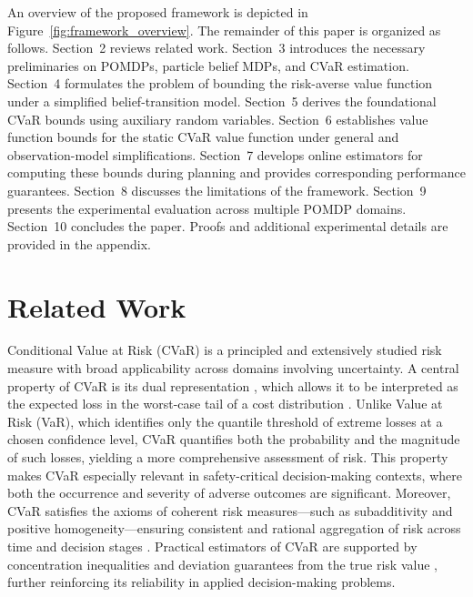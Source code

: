 \documentclass[acmlarge, manuscript, screen, review, natbib=false, oneside]{acmart}
\begin{document}
An overview of the proposed framework is depicted in Figure~\ref{fig:framework_overview}. The remainder of this paper is organized as follows. Section~2 reviews related work. Section~3 introduces the necessary preliminaries on POMDPs, particle belief MDPs, and CVaR estimation. Section~4 formulates the problem of bounding the risk-averse value function under a simplified belief-transition model. Section~5 derives the foundational CVaR bounds using auxiliary random variables. Section~6 establishes value function bounds for the static CVaR value function under general and observation-model simplifications. Section~7 develops online estimators for computing these bounds during planning and provides corresponding performance guarantees. Section~8 discusses the limitations of the framework. Section~9 presents the experimental evaluation across multiple POMDP domains. Section~10 concludes the paper. Proofs and additional experimental details are provided in the appendix.

\section{Related Work}
Conditional Value at Risk (CVaR) \cite{rockafellar2000optimization} is a principled and extensively studied risk measure with broad applicability across domains involving uncertainty. A central property of CVaR is its dual representation \cite{artzner1999coherent}, which allows it to be interpreted as the expected loss in the worst-case tail of a cost distribution \cite{chow2015risk}. Unlike Value at Risk (VaR), which identifies only the quantile threshold of extreme losses at a chosen confidence level, CVaR quantifies both the probability and the magnitude of such losses, yielding a more comprehensive assessment of risk. This property makes CVaR especially relevant in safety-critical decision-making contexts, where both the occurrence and severity of adverse outcomes are significant. Moreover, CVaR satisfies the axioms of coherent risk measures—such as subadditivity and positive homogeneity—ensuring consistent and rational aggregation of risk across time and decision stages \cite{artzner1999coherent}. Practical estimators of CVaR are supported by concentration inequalities and deviation guarantees from the true risk value \cite{brown2007large,pmlr-v97-thomas19a}, further reinforcing its reliability in applied decision-making problems.
\end{document}
